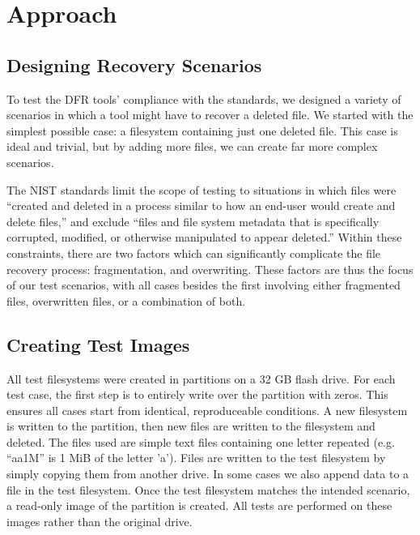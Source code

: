 \section{Approach}

\subsection{Designing Recovery Scenarios}
To test the DFR tools' compliance with the standards, we designed a variety of scenarios in which a tool might have to recover a deleted file. We started with the simplest possible case: a filesystem containing just one deleted file. This case is ideal and trivial, but by adding more files, we can create far more complex scenarios.

The NIST standards limit the scope of testing to situations in which files were ``created and deleted in a process similar to how an end-user would create and delete files,'' and  exclude ``files and file system metadata that is specifically corrupted, modified, or otherwise manipulated to appear deleted.'' %
Within these constraints, there are two factors which can significantly complicate the file recovery process: fragmentation, and overwriting. %
These factors are thus the focus of our test scenarios, with all cases besides the first involving either fragmented files, overwritten files, or a combination of both.


\subsection{Creating Test Images}
All test filesystems were created in partitions on a 32 GB flash drive. For each test case, the first step is to entirely write over the partition with zeros. This ensures all cases start from identical, reproduceable conditions. A new filesystem is written to the partition, then new files are written to the filesystem and deleted. The files used are simple text files containing one letter repeated (e.g. ``aa1M'' is 1 MiB of the letter 'a'). Files are written to the test filesystem by simply copying them from another drive. In some cases we also append data to a file in the test filesystem. Once the test filesystem matches the intended scenario, a read-only image of the partition is created. All tests are performed on these images rather than the original drive.

